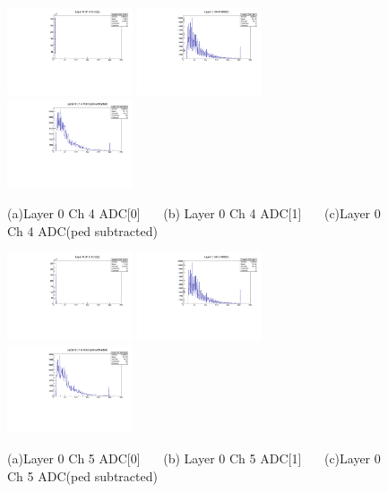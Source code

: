 \documentclass[a4paper,11pt]{article}
\theoremstyle{mytheor}
\begin{document}
\begin{figure}[H] 
\vspace*{-0.3cm} 
\includegraphics[width=0.33\textwidth,scale=0.5,trim=0 0 0 0,clip]{plotsdir/file0_test-Layer0_Ch4_adc0-1.pdf} 
\includegraphics[width=0.33\textwidth,scale=0.5,trim=0 0 0 0,clip]{plotsdir/file0_test-Layer0_Ch4_adc1-1.pdf} 
\includegraphics[width=0.33\textwidth,scale=0.5,trim=0 0 0 0,clip]{plotsdir/file0_test-Layer0_Ch4_adcPedsub-1.pdf} 
\caption{(a)Layer 0 Ch 4 ADC[0] ~~~(b) Layer 0 Ch 4 ADC[1] ~~~(c)Layer 0 Ch 4 ADC(ped subtracted) } 
\end{figure} 
\begin{figure}[H] 
\vspace*{-0.3cm} 
\includegraphics[width=0.33\textwidth,scale=0.5,trim=0 0 0 0,clip]{plotsdir/file0_test-Layer0_Ch5_adc0-1.pdf} 
\includegraphics[width=0.33\textwidth,scale=0.5,trim=0 0 0 0,clip]{plotsdir/file0_test-Layer0_Ch5_adc1-1.pdf} 
\includegraphics[width=0.33\textwidth,scale=0.5,trim=0 0 0 0,clip]{plotsdir/file0_test-Layer0_Ch5_adcPedsub-1.pdf} 
\caption{(a)Layer 0 Ch 5 ADC[0] ~~~(b) Layer 0 Ch 5 ADC[1] ~~~(c)Layer 0 Ch 5 ADC(ped subtracted) } 
\end{figure} 
\end{document}
